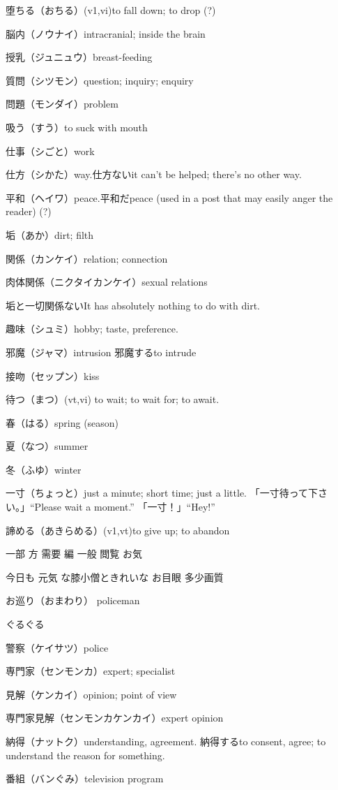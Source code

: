 堕ちる（おちる）(v1,vi)to fall down; to drop (?)

脳内（ノウナイ）intracranial; inside the brain

授乳（ジュニュウ）breast-feeding

質問（シツモン）question; inquiry; enquiry

問題（モンダイ）problem

吸う（すう）to suck with mouth

仕事（シごと）work

仕方（シかた）way.仕方ないit can't be helped; there's no other way.

平和（ヘイワ）peace.平和だpeace (used in a post that may easily anger the reader) (?)

垢（あか）dirt; filth

関係（カンケイ）relation; connection

肉体関係（ニクタイカンケイ）sexual relations

垢と一切関係ないIt has absolutely nothing to do with dirt.

趣味（シュミ）hobby; taste, preference.

邪魔（ジャマ）intrusion
邪魔するto intrude

接吻（セップン）kiss

待つ（まつ）(vt,vi) to wait; to wait for; to await.

春（はる）spring (season)

夏（なつ）summer

冬（ふゆ）winter

一寸（ちょっと）just a minute; short time; just a little.
「一寸待って下さい。」``Please wait a moment.''
「一寸！」``Hey!''

諦める（あきらめる）(v1,vt)to give up; to abandon

一部
方
需要
編
一般
閲覧
お気

今日も
元気
な膝小僧ときれいな
お目眼
多少画質

お巡り（おまわり）
policeman

ぐるぐる

警察（ケイサツ）police

専門家（センモンカ）expert; specialist

見解（ケンカイ）opinion; point of view

専門家見解（センモンカケンカイ）expert opinion

納得（ナットク）understanding, agreement.
納得するto consent, agree; to understand the reason for something.

番組（バンぐみ）television program

